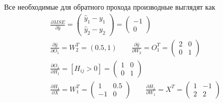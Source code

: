 \begin{sol}
Все необходимые для обратного прохода производные выглядят как
\begin{equation*}
    \begin{aligned} 
    & \frac{\partial MSE}{\partial \hat y} = \begin{pmatrix} \hat y_1 - y_1  \\ \hat y_2 - y_2 \end{pmatrix} = \begin{pmatrix} -1 \\ 0 \end{pmatrix} \\ 
    & \frac{\partial\hat y}{\partial O_1} = W_2^T = (0.5, 1) \qquad  \frac{\partial\hat y}{\partial W_2} = O_1^T = \begin{pmatrix} 2 & 0 \\ 0 & 1 \end{pmatrix} \\
    & \frac{\partial O_1}{\partial H_1} = [H_{ij} > 0] = \begin{pmatrix} 1 & 0 \\ 0 & 1 \end{pmatrix} \\
    & \frac{\partial H_1}{\partial X} = W_1^T = \begin{pmatrix} 1 & 0.5 \\ -1 & 0 \end{pmatrix} \qquad  \frac{\partial H_1}{\partial W_1} = X^T = \begin{pmatrix} 1 & -1 \\ 2 & 2 \end{pmatrix}
    \end{aligned}
\end{equation*}


\end{sol}
